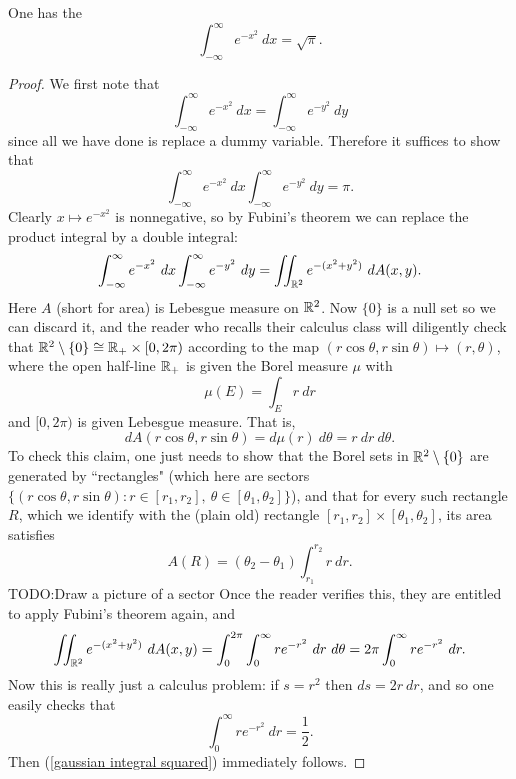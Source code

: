 \begin{corollary}
\label{Gaussian integral formula}
One has the 
$$\int_{-\infty}^\infty e^{-x^2} ~dx = \sqrt \pi.$$
\end{corollary}
\begin{proof}
We first note that
$$\int_{-\infty}^\infty e^{-x^2}~dx = \int_{-\infty}^\infty e^{-y^2}~dy$$
since all we have done is replace a dummy variable. Therefore it suffices to show that
\begin{equation}
\label{gaussian integral squared}
\int_{-\infty}^\infty e^{-x^2}~dx \int_{-\infty}^\infty e^{-y^2}~dy = \pi.
\end{equation}
Clearly $x \mapsto e^{-x^2}$ is nonnegative, so by Fubini's theorem we can replace the product integral by a double integral:
$$\int_{-\infty}^\infty e^{-x^2}~dx \int_{-\infty}^\infty e^{-y^2}~dy = \iint_{\mathbb{R}^2} e^{-(x^2 + y^2)}~dA(x, y).$$
Here $A$ (short for area) is Lebesgue measure on $\mathbb{R}^2$.
Now $\{0\}$ is a null set so we can discard it, and the reader who recalls their calculus class will diligently check that $\mathbb{R}^2 \setminus \{0\} \cong \mathbb{R}_+ \times [0, 2\pi)$ according to the map $(r \cos \theta, r \sin \theta) \mapsto (r, \theta)$, where the open half-line $\mathbb{R}_+$ is given the Borel measure $\mu$ with
$$\mu(E) = \int_E r~dr$$
and $[0, 2\pi)$ is given Lebesgue measure. That is,
$$dA(r \cos \theta, r \sin \theta) = d\mu(r) ~d\theta = r~dr~d\theta.$$
To check this claim, one just needs to show that the Borel sets in $\mathbb{R}^2 \setminus \{0\}$ are generated by ``rectangles" (which here are sectors $\{(r \cos \theta, r \sin \theta): r \in [r_1, r_2], ~\theta \in [\theta_1, \theta_2]\}$), and that for every such rectangle $R$, which we identify with the (plain old) rectangle $[r_1, r_2] \times [\theta_1, \theta_2]$, its area satisfies
$$A(R) = (\theta_2 - \theta_1)\int_{r_1}^{r_2} r~dr.$$
TODO:Draw a picture of a sector
Once the reader verifies this, they are entitled to apply Fubini's theorem again, and
$$\iint_{\mathbb{R}^2} e^{-(x^2 + y^2)}~dA(x, y) = \int_0^{2\pi} \int_0^\infty re^{-r^2}~dr~d\theta = 2\pi \int_0^\infty re^{-r^2}~dr.$$
Now this is really just a calculus problem: if $s = r^2$ then $ds = 2r~dr$, and so one easily checks that
$$\int_0^\infty re^{-r^2}~dr = \frac{1}{2}.$$
Then (\ref{gaussian integral squared}) immediately follows.
\end{proof}

